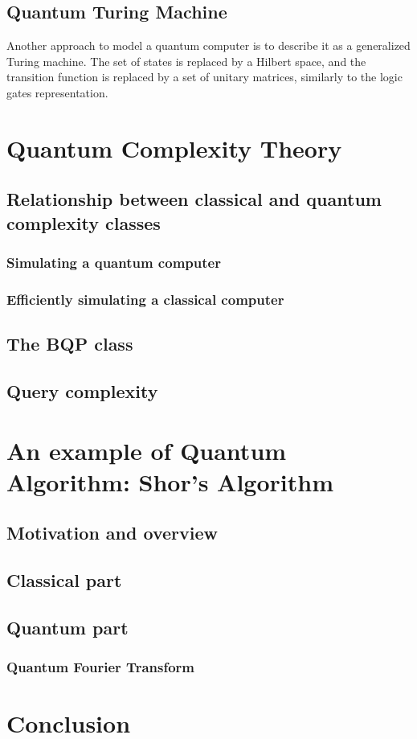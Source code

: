 \documentclass[12pt,a4paper]{article}
\begin{document}
\subsection{Quantum Turing Machine}
Another approach to model a quantum computer is to describe it as a generalized Turing machine. The set of states is replaced by a Hilbert space, and the transition function is replaced by a set of unitary matrices, similarly to the logic gates representation. 

\section{Quantum Complexity Theory}
\subsection{Relationship between classical and quantum complexity classes}
\subsubsection{Simulating a quantum computer}
\subsubsection{Efficiently simulating a classical computer}

\subsection{The BQP class}
\subsection{Query complexity}

\section{An example of Quantum Algorithm: Shor's Algorithm}
\subsection{Motivation and overview}
\subsection{Classical part}
\subsection{Quantum part}
\subsubsection{Quantum Fourier Transform}

\section*{Conclusion}

\nocite{*}


\end{document}
